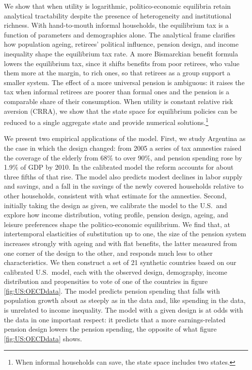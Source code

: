 We show that when utility is logarithmic, politico-economic equilibria retain analytical tractability despite the presence of heterogeneity and institutional richness. With hand-to-mouth informal households, the equilibrium tax is a function of parameters and demographics alone. The analytical frame clarifies how population ageing, retirees' political influence, pension design, and income inequality shape the equilibrium tax rate. A more Bismarckian benefit formula lowers the equilibrium tax, since it shifts benefits from poor retirees, who value them more at the margin, to rich ones, so that retirees as a group support a smaller system. The effect of a more universal pension is ambiguous: it raises the tax when informal retirees are poorer than formal ones and the pension is a comparable share of their consumption. When utility is constant relative risk aversion (CRRA), we show that the state space for equilibrium policies can be reduced to a single aggregate state and provide numerical solutions.\footnote{When informal households can save, the state space includes two states.}

We present two empirical applications of the model. First, we study Argentina as the case in which the design changed: from 2005 a series of tax amnesties raised the coverage of the elderly from 68\% to over 90\%, and pension spending rose by 1.9\% of GDP by 2010. In the calibrated model the reform accounts for about three fifths of that rise. The model also predicts modest declines in labor supply and savings, and a fall in the savings of the newly covered households relative to other households, consistent with what \textcite{Ruffo} estimate for the amnesties. Second, initially taking the design as given, we calibrate the model to the U.S.\ and explore how income distribution, voting profile, pension design, ageing, and leisure preferences shape the politico-economic equilibrium. We find that, at intertemporal elasticities of substitution up to one, the size of the pension system increases strongly with ageing and with flat benefits, the latter measured from one corner of the design to the other, and responds much less to other characteristics. We then construct a set of 21 synthetic countries based on our calibrated U.S.\ model, each with the observed design, demography, income distribution and propensities to vote of one of the countries in figure \ref{fig:US:OECDdata}. The model predicts pension spending that falls with population growth about as steeply as in the data and, like spending in the data, is unrelated to income inequality. The model with a given design is at odds with the data in one important respect: it predicts that a more earnings-related pension design lowers the pension spending, the opposite of what figure \ref{fig:US:OECDdata} shows. 


